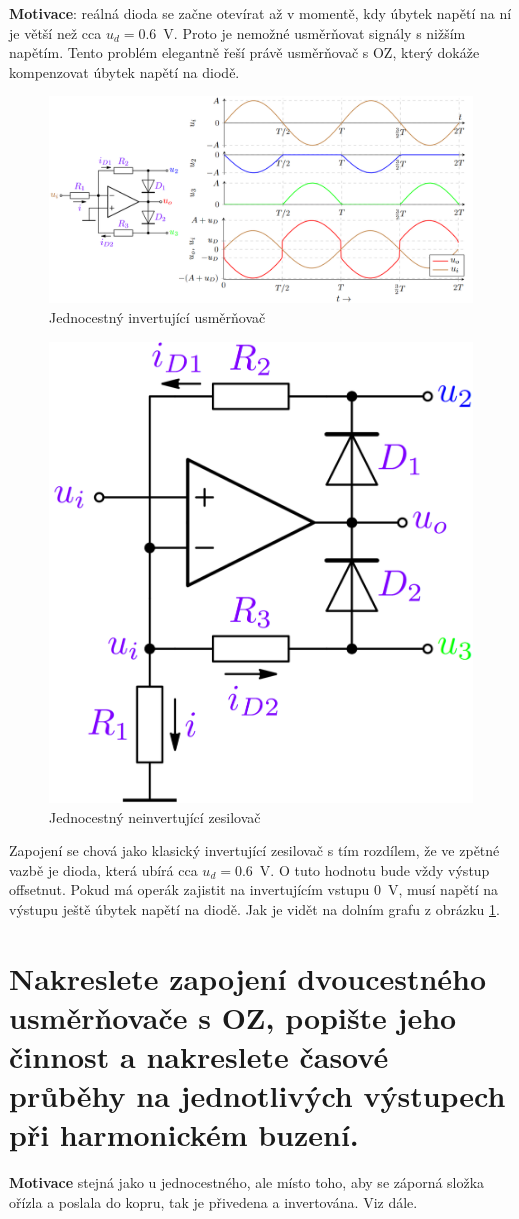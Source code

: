 \documentclass[a4paper,12pt]{article}   %
\begin{document}
\textbf{Motivace}: reálná dioda se začne otevírat až v momentě, kdy úbytek napětí na ní je větší než cca $u_d = 0.6$~V. Proto je nemožné usměrňovat signály s nižším napětím. Tento problém elegantně řeší právě usměrňovač s OZ, který dokáže kompenzovat úbytek napětí na diodě.

\begin{figure}
    \centering
    \includegraphics[width=\textwidth]{jednocestny-usmernovac.PNG}
    \caption{Jednocestný invertující usměrňovač}
    \label{fig:jednocestny:usmernovac}
\end{figure}
\begin{figure}
    \centering
    \includegraphics[width = .3\textwidth]{jednocestny-usmernovac-noninvert.PNG}
    \caption{Jednocestný neinvertující zesilovač}
    \label{fig:jendocestny:usmernovat:noninvert}
\end{figure}

Zapojení se chová jako klasický invertující zesilovač s tím rozdílem, že ve zpětné vazbě je dioda, která ubírá cca $u_d = 0.6$~V. O tuto hodnotu bude vždy výstup offsetnut. Pokud má operák zajistit na invertujícím vstupu 0~V, musí napětí na výstupu ještě  úbytek napětí na diodě. Jak je vidět na dolním grafu z obrázku \ref{fig:jednocestny:usmernovac}.








\section{Nakreslete zapojení dvoucestného usměrňovače s OZ, popište jeho činnost a nakreslete časové průběhy na jednotlivých výstupech při harmonickém buzení.}
\textbf{Motivace} stejná jako u jednocestného, ale místo toho, aby se záporná složka ořízla a poslala do kopru, tak je přivedena a invertována. Viz dále.
\end{document}
